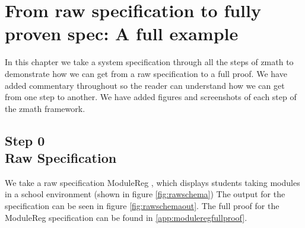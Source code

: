 \chapter{From raw specification to fully proven spec: A full example}
\label{ch:fullexample}

In this chapter we take a system specification through all the steps of
\gls{zmath} to demonstrate how we can get from a raw specification to a full
proof. We have added commentary throughout so the reader can understand how we
can get from one step to another. We have added figures and screenshots of each
step of the \gls{zmath} framework.

\section{Step 0\\Raw Specification}
We take a raw specification ModuleReg \cite{essenceofz}, which displays students
taking modules in a school environment (shown in figure \ref{fig:rawschema}) The
output for the specification can be seen in figure \ref{fig:rawschemaout}. The
full proof for the ModuleReg specification can be found in \ref{app:moduleregfullproof}.

